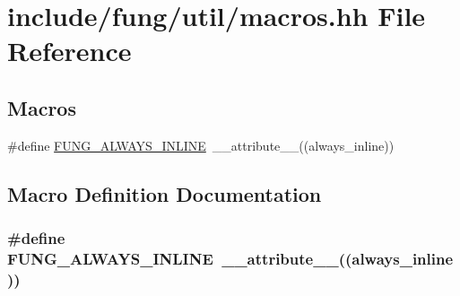 \hypertarget{macros_8hh}{}\section{include/fung/util/macros.hh File Reference}
\label{macros_8hh}
\subsection*{Macros}
\begin{DoxyCompactItemize}
\item 
\#define \hyperlink{macros_8hh_a03b9da186125795e5afa49d0ef1cc32f}{F\+U\+N\+G\+\_\+\+A\+L\+W\+A\+Y\+S\+\_\+\+I\+N\+L\+I\+NE}~\+\_\+\+\_\+attribute\+\_\+\+\_\+((always\+\_\+inline))
\end{DoxyCompactItemize}


\subsection{Macro Definition Documentation}
\subsubsection[{\texorpdfstring{F\+U\+N\+G\+\_\+\+A\+L\+W\+A\+Y\+S\+\_\+\+I\+N\+L\+I\+NE}{FUNG_ALWAYS_INLINE}}]{\setlength{\rightskip}{0pt plus 5cm}\#define F\+U\+N\+G\+\_\+\+A\+L\+W\+A\+Y\+S\+\_\+\+I\+N\+L\+I\+NE~\+\_\+\+\_\+attribute\+\_\+\+\_\+((always\+\_\+inline))}\hypertarget{macros_8hh_a03b9da186125795e5afa49d0ef1cc32f}{}\label{macros_8hh_a03b9da186125795e5afa49d0ef1cc32f}
